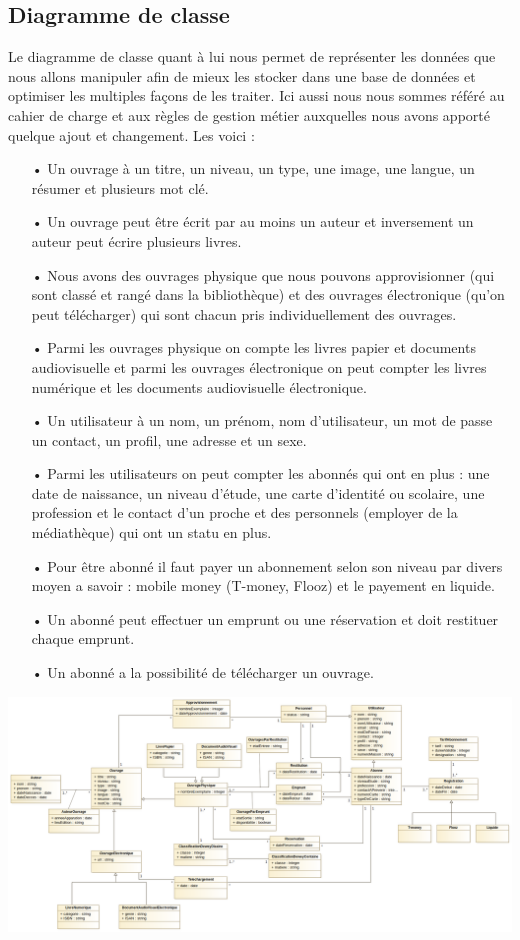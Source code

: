\documentclass[12pt,a4paper]{article}
\begin{document}
\subsection{Diagramme de classe}
Le diagramme de classe quant à lui nous permet de représenter les données que nous 
allons manipuler afin de mieux les stocker dans une base de données et optimiser les multiples
façons de les traiter. Ici aussi nous nous sommes référé au cahier de charge et 
aux règles de gestion métier auxquelles nous avons apporté quelque ajout et changement.
Les voici :
\begin{itemize}
\item[•] Un ouvrage à un titre, un niveau, un type, une image, une langue, un résumer et
plusieurs mot clé.
\item[•] Un ouvrage peut être écrit par au moins un auteur et inversement un auteur peut
écrire plusieurs livres.
\item[•] Nous avons des ouvrages physique que nous pouvons approvisionner (qui sont
classé et rangé dans la bibliothèque) et des ouvrages électronique (qu'on peut 
télécharger) qui sont chacun pris individuellement des ouvrages.
\item[•] Parmi les ouvrages physique on compte les livres papier et documents
audiovisuelle et parmi les ouvrages électronique on peut compter les livres numérique
et les documents audiovisuelle électronique.
\item[•] Un utilisateur à un nom, un prénom, nom d'utilisateur, un mot de passe un 
contact, un profil, une adresse et un sexe.
\item[•] Parmi les utilisateurs on peut compter les abonnés qui ont en plus : une date
de naissance, un niveau d'étude, une carte d'identité ou scolaire, une profession et le
contact d'un proche et des personnels (employer de la médiathèque) qui ont un statu en 
plus. 
\item[•] Pour être abonné il faut payer un abonnement selon son niveau par divers moyen
a savoir : mobile money (T-money, Flooz) et le payement en liquide.
\item[•] Un abonné peut effectuer un emprunt ou une réservation et doit restituer
chaque emprunt.
\item[•] Un abonné a la possibilité de télécharger un ouvrage.
\end{itemize}
\newpage
\includegraphics[scale=0.25]{images/CD.png}
\newpage
\end{document}

